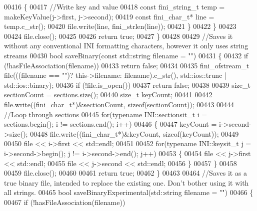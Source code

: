 \begin{DoxyCode}
00416          \{
00417             \textcolor{comment}{//Write key and value}
00418             \textcolor{keyword}{const} fini_string_t temp = makeKeyValue(j->first, j->second);
00419             \textcolor{keyword}{const} fini_char_t* line = temp.c\_str();
00420             file.write(line, fini_strlen(line));
00421          \}
00422       \}
00423 
00424       file.close();
00425 
00426       \textcolor{keywordflow}{return} \textcolor{keyword}{true};
00427    \}
00428 
00429    \textcolor{comment}{//Saves it without any conventional INI formatting characters, however it only uses string streams}
00430    \textcolor{keywordtype}{bool} saveBinary(\textcolor{keyword}{const} std::string filename = \textcolor{stringliteral}{""})
00431    \{
00432       \textcolor{keywordflow}{if} (!hasFileAssociation(filename))
00433          \textcolor{keywordflow}{return} \textcolor{keyword}{false};
00434 
00435       fini_ofstream_t file(((filename == \textcolor{stringliteral}{""})? this->filename: filename).c\_str(), std::ios::trunc | 
      std::ios::binary);
00436       \textcolor{keywordflow}{if} (!file.is\_open())
00437          \textcolor{keywordflow}{return} \textcolor{keyword}{false};
00438 
00439       \textcolor{keywordtype}{size\_t} sectionCount = sections.size();
00440       \textcolor{keywordtype}{size\_t} keyCount;
00441 
00442       file.write((fini_char_t*)&sectionCount, \textcolor{keyword}{sizeof}(sectionCount));
00443 
00444       \textcolor{comment}{//Loop through sections}
00445       \textcolor{keywordflow}{for}(\textcolor{keyword}{typename} INI::sectionsit_t i = sections.begin(); i != sections.end(); 
      i++)
00446       \{
00447          keyCount = i->second->size();
00448          file.write((fini_char_t*)&keyCount, \textcolor{keyword}{sizeof}(keyCount));
00449 
00450          file << i->first << std::endl;
00451 
00452          \textcolor{keywordflow}{for}(\textcolor{keyword}{typename} INI::keysit_t j = i->second->begin(); j != i->second->end(); j++)
00453          \{
00454             file << j->first << std::endl;
00455             file << j->second << std::endl;
00456          \}
00457       \}
00458 
00459       file.close();
00460 
00461       \textcolor{keywordflow}{return} \textcolor{keyword}{true};
00462    \}
00463 
00464    \textcolor{comment}{//Saves it as a true binary file, intended to replace the existing one. Don't bother using it with all
       strings.}
00465    \textcolor{keywordtype}{bool} saveBinaryExperimental(std::string filename = \textcolor{stringliteral}{""})
00466    \{
00467       \textcolor{keywordflow}{if} (!hasFileAssociation(filename))

\end{DoxyCode}
